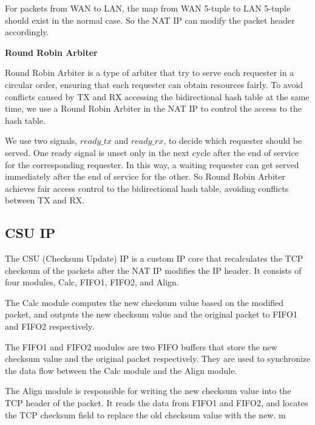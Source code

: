     For packets from WAN to LAN, the map from WAN 5-tuple to LAN 5-tuple should exist in the normal case. So the NAT IP can modify the packet header accordingly.

    \textbf{Round Robin Arbiter}\

    Round Robin Arbiter is a type of arbiter that try to serve each requester in a circular order, ensuring that each requester can obtain resources fairly. To avoid conflicts caused by TX and RX accessing the bidirectional hash table at the same time, we use a Round Robin Arbiter in the NAT IP to control the access to the hash table. 

    We use two signals, $ready\_tx$ and $ready\_rx$, to decide which requester should be served. One ready signal  is unset only in the next cycle after the end of service for the corresponding requester. In this way, a waiting requester can get served immediately after the end of service for the other. So Round Robin Arbiter achieves fair access control to the bidirectional hash table, avoiding conflicts between TX and RX.
    
\subsection{CSU IP}
    The CSU (Checksum Update) IP is a custom IP core that recalculates the TCP checksum of the packets after the NAT IP modifies the IP header. It consists of four modules, Calc, FIFO1, FIFO2, and Align. 

    The Calc module computes the new checksum value based on the modified packet, and outputs the new checksum value and the original packet to FIFO1 and FIFO2 respectively.

    The FIFO1 and FIFO2 modules are two FIFO buffers that store the new checksum value and the original packet respectively. They are used to synchronize the data flow between the Calc module and the Align module. 

    The Align module is responsible for writing the new checksum value into the TCP header of the packet. It reads the data from FIFO1 and FIFO2, and locates the TCP checksum field to replace the old checksum value with the new.
m